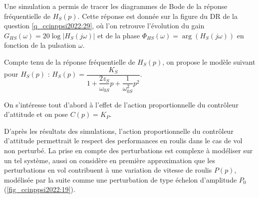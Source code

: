 Une simulation a permis de tracer les diagrammes de Bode de la réponse fréquentielle de
$H_S (p)$. Cette réponse est donnée sur la figure du DR de la question \ref{q_ccinppsi2022:29}, où l’on retrouve l’évolution du
gain $G_{HS}(\omega) = 20 \log |H_S (j\omega)|$ et de la phase $\Phi_{HS} (\omega) = \arg\left(H_S (j\omega)\right)$ en fonction de la pulsation $\omega$.

Compte tenu de la réponse fréquentielle de $H_S (p)$, on propose le modèle suivant pour $H_S (p)$ :
$H_S(p)=\dfrac{K_S}{1+\dfrac{2z_S}{\omega_{0S}}p+\dfrac{1}{\omega_{0S}^2}p^2}$.


\ifprof
\begin{corrige}
\end{corrige}
\else
\fi


\ifprof
\begin{corrige}
\end{corrige}
\else
\fi

\ifprof
\begin{corrige}
\end{corrige}
\else
\fi

On s’intéresse tout d’abord à l’effet de l’action proportionnelle du contrôleur d’attitude et on
pose $C(p) = K_P$.


\ifprof
\begin{corrige}
\end{corrige}
\else
\fi


D’après les résultats des simulations, l’action proportionnelle du contrôleur d’attitude permettrait le respect des performances en roulis dans le cas de vol non perturbé. La prise en
compte des perturbations est complexe à modéliser sur un tel système, aussi on considère
en première approximation que les perturbations en vol contribuent à une variation de vitesse
de roulis $P(p)$, modélisée par la suite comme une perturbation de type échelon d’amplitude $P_0$
(\autoref{fig_ccinppsi2022:19}).

